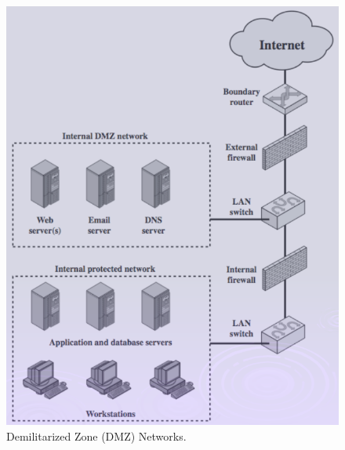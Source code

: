 \documentclass[11pt, a4paper, twoside, italian]{report}
\theoremstyle{plain}
\begin{document}
\begin{multicols}{2}
	\begin{figure}[H]
		\centering
		\includegraphics[scale=0.6]{firewallDMZ}
		\caption*{Demilitarized Zone (DMZ) Networks.}
	\end{figure}
\columnbreak
	\begin{figure}[H]
		\centering

\end{figure}
\end{multicols}
\end{document}
